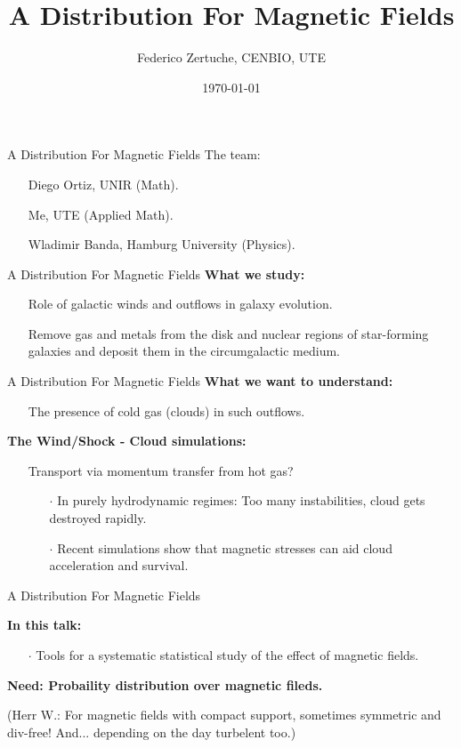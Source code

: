 \documentclass{beamer}
\title{A Distribution For Magnetic Fields}
\author{Federico Zertuche, CENBIO, UTE}
\date{\today}
\begin{document}
\begin{frame}
\titlepage
\end{frame}

\begin{frame}{A Distribution For Magnetic Fields}
The team:
\begin{itemize}
  \item[] Diego Ortiz, UNIR (Math).
  \item[] Me, UTE (Applied Math).
  \item[] Wladimir Banda, Hamburg University (Physics).
\end{itemize}
\end{frame}


\begin{frame}{A Distribution For Magnetic Fields}
 \textbf{What we study:}
 \begin{itemize}
  \setlength\itemsep{1em}
  \item[] Role of galactic winds and outflows in galaxy evolution.
  \item[] Remove gas and metals from the disk and nuclear regions of star-forming galaxies and deposit them in the circumgalactic medium.
\end{itemize}
\end{frame}


\begin{frame}{A Distribution For Magnetic Fields}
  \textbf{What we want to understand:}
\begin{itemize}
  \setlength\itemsep{1em}
  \item[] The presence of cold gas (clouds) in such outflows.
\end{itemize}


\textbf{The Wind/Shock - Cloud simulations:}
\begin{itemize}
  \item[] Transport via momentum transfer from hot gas?
  \begin{itemize}
    \item[$\cdot$] In purely hydrodynamic regimes: Too many instabilities, cloud gets destroyed rapidly.
    \item[$\cdot$] Recent simulations show that magnetic stresses can aid cloud acceleration and survival.
  \end{itemize}
\end{itemize}
\end{frame}

\begin{frame}{A Distribution For Magnetic Fields}

  \textbf{In this talk:}
  \begin{itemize}
    \setlength\itemsep{1em}
    \item[$\cdot$] Tools for a systematic statistical study of the effect of magnetic fields.
  \end{itemize}

  \vspace{1em}
  \textbf{Need: Probaility distribution over magnetic fileds.}

  (Herr W.: For magnetic fields with compact support, sometimes symmetric and div-free! And... depending on the day turbelent too.)

\end{frame}
\end{document}
